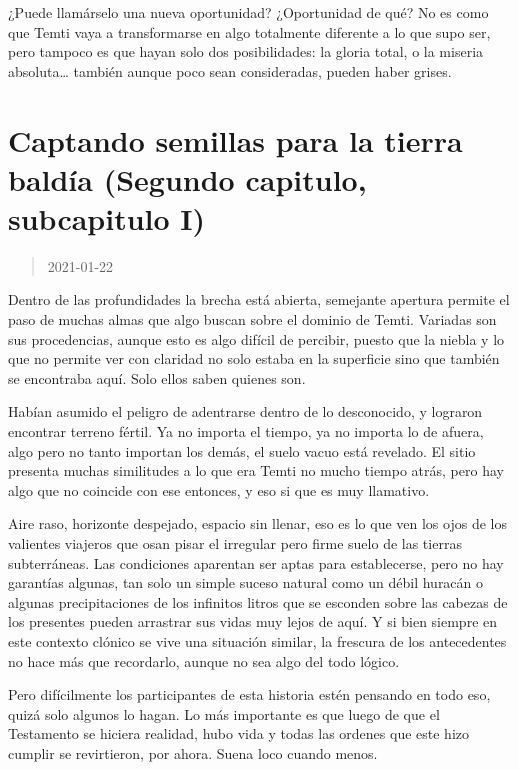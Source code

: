 \documentclass[
  spanish,
]{book}
\begin{document}
¿Puede llamárselo una nueva oportunidad? ¿Oportunidad de qué? No es como que Temti vaya a transformarse en algo totalmente diferente a lo que supo ser, pero tampoco es que hayan solo dos posibilidades: la gloria total, o la miseria absoluta\ldots{} también aunque poco sean consideradas, pueden haber grises.

\hypertarget{captando-semillas-para-la-tierra-balduxeda-segundo-capitulo-subcapitulo-i}{%
\section{Captando semillas para la tierra baldía (Segundo capitulo, subcapitulo I)}\label{captando-semillas-para-la-tierra-balduxeda-segundo-capitulo-subcapitulo-i}}

\begin{quote}
2021-01-22
\end{quote}

Dentro de las profundidades la brecha está abierta, semejante apertura permite el paso de muchas almas que algo buscan sobre el dominio de Temti. Variadas son sus procedencias, aunque esto es algo difícil de percibir, puesto que la niebla y lo que no permite ver con claridad no solo estaba en la superficie sino que también se encontraba aquí. Solo ellos saben quienes son.

Habían asumido el peligro de adentrarse dentro de lo desconocido, y lograron encontrar terreno fértil. Ya no importa el tiempo, ya no importa lo de afuera, algo pero no tanto importan los demás, el suelo vacuo está revelado. El sitio presenta muchas similitudes a lo que era Temti no mucho tiempo atrás, pero hay algo que no coincide con ese entonces, y eso si que es muy llamativo.

Aire raso, horizonte despejado, espacio sin llenar, eso es lo que ven los ojos de los valientes viajeros que osan pisar el irregular pero firme suelo de las tierras subterráneas. Las condiciones aparentan ser aptas para establecerse, pero no hay garantías algunas, tan solo un simple suceso natural como un débil huracán o algunas precipitaciones de los infinitos litros que se esconden sobre las cabezas de los presentes pueden arrastrar sus vidas muy lejos de aquí. Y si bien siempre en este contexto clónico se vive una situación similar, la frescura de los antecedentes no hace más que recordarlo, aunque no sea algo del todo lógico.

Pero difícilmente los participantes de esta historia estén pensando en todo eso, quizá solo algunos lo hagan. Lo más importante es que luego de que el Testamento se hiciera realidad, hubo vida y todas las ordenes que este hizo cumplir se revirtieron, por ahora. Suena loco cuando menos.
\end{document}
